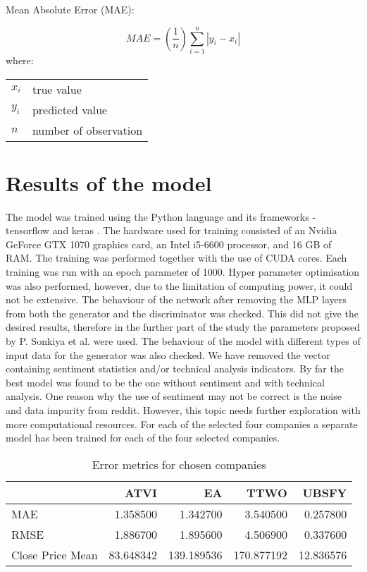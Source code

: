 \documentclass[11pt]{article} %
\makeatletter
\newenvironment{conditions}
  {\par\vspace{\abovedisplayskip}\noindent\begin{tabular}{>{$}l<{$} @{${}={}$} l}}
  {\end{tabular}\par\vspace{\belowdisplayskip}}
\makeatother
\begin{document}
\begin{center}  Mean Absolute Error (MAE): \end{center}
\begin{equation} MAE =(\frac{1}{n})\sum_{i=1}^{n}\left | y_{i} - x_{i} \right | \end{equation}
where:
\begin{conditions}
 x_i     &  true value \\
 y_i     &  predicted value \\   
 n &  number of observation
\end{conditions}
\section{Results of the model}

The model was trained using the Python language and its frameworks - tensorflow \cite{tensorflow}  and keras \cite{keras}\cite{keras-2}. The hardware used for training consisted of an Nvidia GeForce GTX 1070 graphics card, an Intel i5-6600 processor, and 16 GB of RAM. The training was performed together with the use of CUDA cores. Each training was run with an epoch parameter of 1000. Hyper parameter optimisation was also performed,  however, due to the limitation of computing power, it could not be extensive. The behaviour of the network after removing the MLP layers from both the generator and the discriminator was checked. This did not give the desired results, therefore in the further part of the study the parameters proposed by P. Sonkiya et al. were used. The behaviour of the model with different types of input data for the generator was also checked. We have removed  the vector containing sentiment statistics and/or technical analysis indicators. By far the best model was found to be the one without sentiment and with technical analysis. One reason why the use of sentiment may not be correct is the noise and data impurity from reddit. However, this topic needs further exploration with more computational resources. For each of the selected four companies 
a separate model has been trained for each of the four selected companies. 

\begin{table}[H]
\centering
\caption{Error metrics for chosen companies}
\begin{tabular}{lrrrr}
\toprule
{} &       ATVI &          EA &        TTWO &      UBSFY \\
\midrule
MAE              &   1.358500 &    1.342700 &    3.540500 &   0.257800 \\
RMSE             &   1.886700 &    1.895600 &    4.506900 &   0.337600 \\
Close Price Mean &  83.648342 &  139.189536 &  170.877192 &  12.836576 \\
\bottomrule
\end{tabular}
\end{table}
\end{document}
